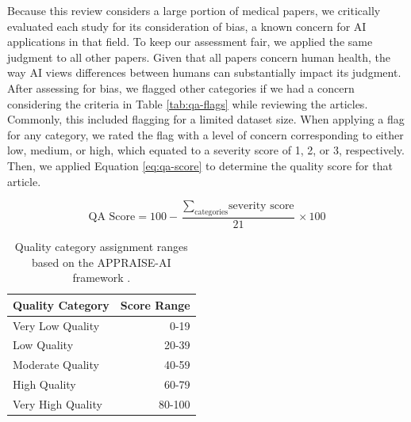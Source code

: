 \documentclass[authoryear,preprint,12pt]{elsarticle}
\begin{document}
\begin{table}[h]
    \centering
    \renewcommand{\arraystretch}{1.1}
    \small
    \caption{Flag categories used for quality assessment based on APPRAISE-AI
    framework \cite{kwongAPPRAISEAIToolQuantitative2023}.}
    
    \label{tab:qa-flags}
\end{table}

Because this review considers a large portion of medical papers, we critically
evaluated each study for its consideration of bias, a known concern for AI
applications in that field. To keep our assessment fair, we applied the same
judgment to all other papers. Given that all papers concern human health, the
way AI views differences between humans can substantially impact its judgment.
After assessing for bias, we flagged other categories if we had a concern
considering the criteria in Table \ref{tab:qa-flags} while reviewing the
articles. Commonly, this included flagging for a limited dataset size. When
applying a flag for any category, we rated the flag with a level of concern
corresponding to either low, medium, or high, which equated to a severity score
of 1, 2, or 3, respectively. Then, we applied Equation \ref{eq:qa-score} to
determine the quality score for that article.

\begin{equation}
    \text{QA Score} = 100 - \frac{\sum_{\text{categories}} \text{severity score}}{21} \times 100
    \label{eq:qa-score}
\end{equation}

\begin{table}[ht!]
    \centering
    \caption{Quality category assignment ranges based on the APPRAISE-AI
    framework \cite{kwongAPPRAISEAIToolQuantitative2023}.}
    \begin{tabular}{lr}
        \toprule
        Quality Category & Score Range \\
        \midrule
        Very Low Quality & 0-19 \\
        Low Quality & 20-39 \\ 
        Moderate Quality & 40-59\\
        High Quality & 60-79\\
        Very High Quality & 80-100 \\
        \bottomrule
    \end{tabular}
    \label{tab:qa-ranges}
\end{table}
\end{document}
